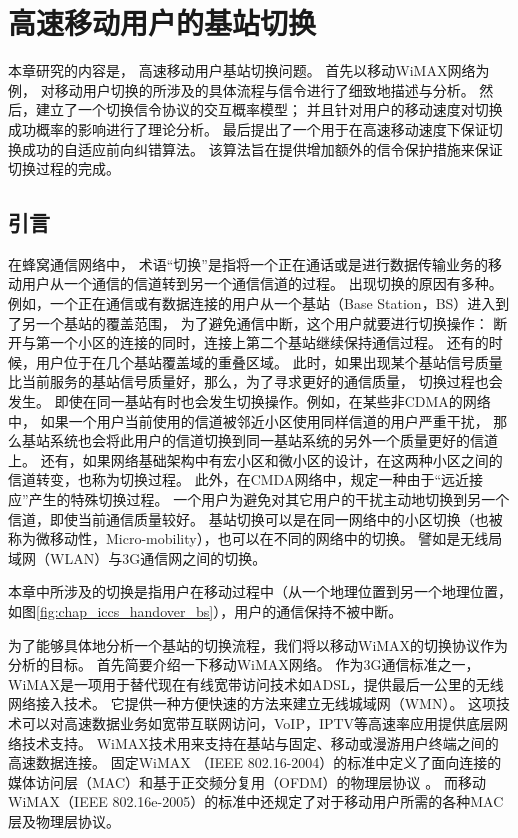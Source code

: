 \graphicspath{ {../body/handover_figures/}}
\chapter{高速移动用户的基站切换}
\label{chap_iccs_handover_alogrithm}
本章研究的内容是，
高速移动用户基站切换问题。
首先以移动WiMAX网络为例，
对移动用户切换的所涉及的具体流程与信令进行了细致地描述与分析。
然后，建立了一个切换信令协议的交互概率模型；
并且针对用户的移动速度对切换成功概率的影响进行了理论分析。
最后提出了一个用于在高速移动速度下保证切换成功的自适应前向纠错算法。
该算法旨在提供增加额外的信令保护措施来保证切换过程的完成。


\section{引言}
\label{section_iccs_handover_algorithm_introduction}
在蜂窝通信网络中，
术语“切换”是指将一个正在通话或是进行数据传输业务的移动用户从一个通信的信道转到另一个通信信道的过程。
出现切换的原因有多种。
例如，一个正在通信或有数据连接的用户从一个基站（Base Station，BS）进入到了另一个基站的覆盖范围，
为了避免通信中断，这个用户就要进行切换操作：
断开与第一个小区的连接的同时，连接上第二个基站继续保持通信过程。
还有的时候，用户位于在几个基站覆盖域的重叠区域。
此时，如果出现某个基站信号质量比当前服务的基站信号质量好，那么，为了寻求更好的通信质量，
切换过程也会发生。
即使在同一基站有时也会发生切换操作。例如，在某些非CDMA的网络中，
如果一个用户当前使用的信道被邻近小区使用同样信道的用户严重干扰，
那么基站系统也会将此用户的信道切换到同一基站系统的另外一个质量更好的信道上。
还有，如果网络基础架构中有宏小区和微小区的设计，在这两种小区之间的信道转变，也称为切换过程。
此外，在CMDA网络中，规定一种由于“远近接应”产生的特殊切换过程。
一个用户为避免对其它用户的干扰主动地切换到另一个信道，即使当前通信质量较好。
基站切换可以是在同一网络中的小区切换（也被称为微移动性，Micro-mobility），也可以在不同的网络中的切换。
譬如是无线局域网（WLAN）与3G通信网之间的切换。

本章中所涉及的切换是指用户在移动过程中（从一个地理位置到另一个地理位置，如图\ref{fig:chap_iccs_handover_bs}），用户的通信保持不被中断\cite{Pollini:1996:THD}\cite{Wright:ICMB2007}。

为了能够具体地分析一个基站的切换流程，我们将以移动WiMAX的切换协议作为分析的目标。
首先简要介绍一下移动WiMAX网络。
作为3G通信标准之一，WiMAX是一项用于替代现在有线宽带访问技术如ADSL，提供最后一公里的无线网络接入技术。
它提供一种方便快速的方法来建立无线城域网（WMN）。
这项技术可以对高速数据业务如宽带互联网访问，VoIP，IPTV等高速率应用提供底层网络技术支持。
WiMAX技术用来支持在基站与固定、移动或漫游用户终端之间的高速数据连接。
固定WiMAX （IEEE 802.16-2004）的标准中定义了面向连接的媒体访问层（MAC）和基于正交频分复用（OFDM）的物理层协议 \cite{IEEE:802_16D:2005}。
而移动WiMAX（IEEE 802.16e-2005）的标准中还规定了对于移动用户所需的各种MAC层及物理层协议\cite{IEEE:802_16E:2006}。


